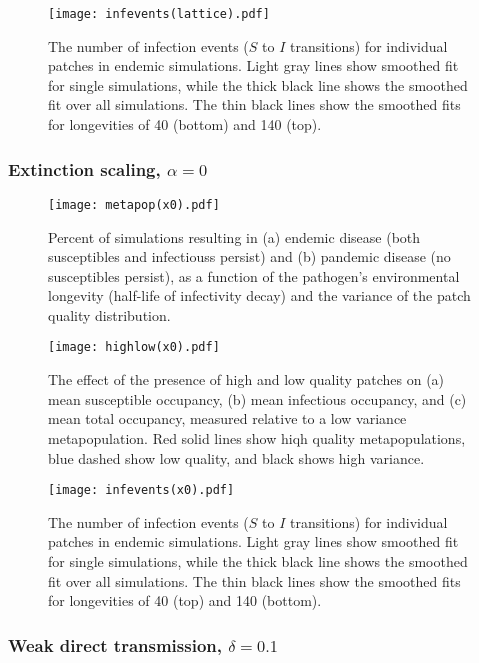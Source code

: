 \documentclass{svjour3}
\begin{document}
\begin{figure}
\centering
\texttt{[image: infevents(lattice).pdf]}
\caption{The number of infection events ($S$ to $I$ transitions) for individual patches in endemic simulations.  Light gray lines show smoothed fit for single simulations, while the thick black line shows the smoothed fit over all simulations.  The thin black lines show the smoothed fits for longevities of 40 (bottom) and 140 (top).}
\label{infections_lattice}
\end{figure}

\clearpage

\subsubsection{Extinction scaling, $\alpha = 0$}

\begin{figure}[h!]
\centering
\texttt{[image: metapop(x0).pdf]}
\caption{Percent of simulations resulting in (a) endemic disease (both susceptibles and infectiouss persist) and (b) pandemic disease (no susceptibles persist), as a function of the pathogen's environmental longevity (half-life of infectivity decay) and the variance of the patch quality distribution.}
\label{poutcome_x0}
\end{figure}   

\begin{figure}
\centering
\texttt{[image: highlow(x0).pdf]}
\caption{The effect of the presence of high and low quality patches on (a) mean susceptible occupancy, (b) mean infectious occupancy, and (c) mean total occupancy, measured relative to  a low variance metapopulation.  Red solid lines show hiqh quality metapopulations, blue dashed show low quality, and black shows high variance.}
\label{sens_x0}
\end{figure}

\begin{figure}
\centering
\texttt{[image: infevents(x0).pdf]}
\caption{The number of infection events ($S$ to $I$ transitions) for individual patches in endemic simulations.  Light gray lines show smoothed fit for single simulations, while the thick black line shows the smoothed fit over all simulations.  The thin black lines show the smoothed fits for longevities of 40 (top) and 140 (bottom).}
\label{infections_x0}
\end{figure}

\clearpage

\subsubsection{Weak direct transmission, $\delta = 0.1$}
\end{document}
